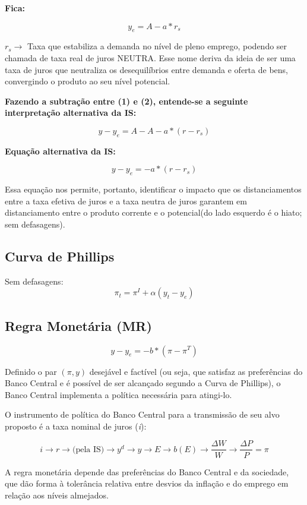 \documentclass[a4paper,12pt]{article}[abntex2]
\begin{document}
\textbf{Fica:}

\[
y_e = A - a * r_s \tag{2}
\]

\( r_s \rightarrow\)  Taxa que estabiliza a demanda no nível de pleno emprego, podendo ser chamada de taxa real de juros NEUTRA. Esse nome deriva da ideia de ser uma taxa de juros que neutraliza os desequilíbrios entre demanda e oferta de bens, convergindo o produto ao seu nível potencial.

\textbf{Fazendo a subtração entre (1) e (2), entende-se a seguinte interpretação alternativa da IS:}

\[
y - y_e = A - A - a * (r - r_s)
\]

\textbf{Equação alternativa da IS:} 

\[
{y - y_e = -a * (r - r_s)}
\]

Essa equação nos permite, portanto, identificar o impacto que os distanciamentos entre a taxa efetiva de juros e a taxa neutra de juros garantem em distanciamento entre o produto corrente e o potencial(do lado esquerdo é o hiato; sem defasagens). 

\subsection{\textbf{Curva de Phillips}}
Sem defasagens:
\[
\pi_t = \pi^I + \alpha (y_t - y_e)
\]


\subsection{\textbf{Regra Monetária (MR)}}



\[
y - y_e = -b * (\pi - \pi^T)
\]

Definido o par \((\pi, y)\) desejável e factível (ou seja, que satisfaz as preferências do Banco Central e é possível de ser alcançado segundo a Curva de Phillips), o Banco Central implementa a política necessária para atingi-lo.

O instrumento de política do Banco Central para a transmissão de seu alvo proposto é a taxa nominal de juros (\textit{i}):

\[
i \to r \to \text{(pela IS)} \to y^d \to y \to E \to b(E) \to \frac{\Delta W}{W} \to \frac{\Delta P}{P} = \pi
\]

A regra monetária depende das preferências do Banco Central e da sociedade, que dão forma à tolerância relativa entre desvios da inflação e do emprego em relação aos níveis almejados.
\end{document}
